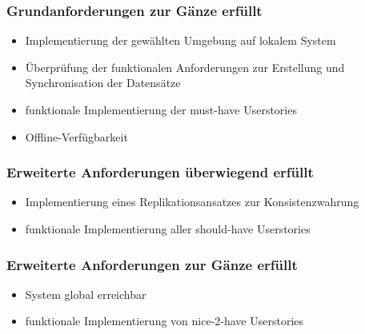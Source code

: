 \subsubsection{Grundanforderungen \textbf{zur Gänze erfüllt}}

\begin{itemize}
    \item Implementierung der gewählten Umgebung auf lokalem System
    \item Überprüfung der funktionalen Anforderungen zur Erstellung und Synchronisation der Datensätze
    \item funktionale Implementierung der must-have Userstories
    \item Offline-Verfügbarkeit
\end{itemize}

\subsubsection{Erweiterte Anforderungen \textbf{überwiegend erfüllt}}

\begin{itemize}
    \item Implementierung eines Replikationsansatzes zur Konsistenzwahrung
    \item funktionale Implementierung aller should-have Userstories
\end{itemize}

\subsubsection{Erweiterte Anforderungen \textbf{zur Gänze erfüllt}}

\begin{itemize}
    \item System global erreichbar
    \item funktionale Implementierung von nice-2-have Userstories
\end{itemize}

